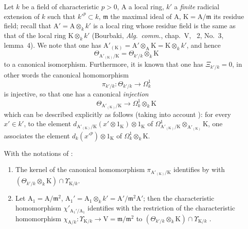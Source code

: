 \begin{env}[22.5.5]
\label{0.22.5.5}
Let $k$ be a field of characteristic $p>0$, $\mathrm{A}$ a local ring, $k'$ a \emph{finite} radicial extension of $k$ such that $k'^p\subset k$, $\mathfrak{m}$ the maximal ideal of $\mathrm{A}$, $\mathrm{K}=\mathrm{A}/\mathfrak{m}$ its residue field; recall that $\mathrm{A}'=\mathrm{A}\otimes_kk'$ is a local ring whose residue field is the same as that of the local ring $\mathrm{K}\otimes_kk'$ (Bourbaki, \emph{Alg.~comm.}, chap.~V, \textsection~2, No.~3, lemma~4).
We note that one has $\mathrm{A}'_{(\mathrm{K})}=\mathrm{A}'\otimes_\mathrm{A}\mathrm{K}=\mathrm{K}\otimes_kk'$, and hence 
\[
\label{0.22.5.5.1}
  \Theta_{\mathrm{A}'_{(\mathrm{K})}/\mathrm{K}}=\Theta_{k'/k}\otimes_k\mathrm{K}
  \tag{22.5.5.1}
\]
to a canonical isomorphism.
Furthermore, it is known  that one has $\Xi_{k'/k}=0$, in other words the canonical homomorphism 
\[
  \pi_{k'/k}:\Theta_{k'/k}\to\Omega^1_k
\]
is injective, so that one has a canonical \emph{injection}
\[
\label{0.22.5.5.2}
  \Theta_{\mathrm{A}'_{(\mathrm{K})}/\mathrm{K}}\to\Omega^1_k\otimes_k\mathrm{K}
  \tag{22.5.5.2}
\]
which can be described explicitly as follows (taking into account ): for every $x'\in k'$, to the element $d_{\mathrm{A}'_{(\mathrm{K})}/\mathrm{K}}(x'\otimes 1_\mathrm{K})\otimes 1_\mathrm{K}$ of $\Omega^1_{\mathrm{A}'_{(\mathrm{K})}/\mathrm{K}}\otimes_{\mathrm{A}'_{(\mathrm{K})}}\mathrm{K}$, one associates the element $d_k(x'^p)\otimes 1_\mathrm{K}$ of $\Omega^1_k\otimes_k\mathrm{K}$.
\end{env}

\begin{lemma}[22.5.6]
\label{0.22.5.6}
With the notations of :
\begin{enumerate}
  \item[\rm{(i)}] The kernel of the canonical homomorphism $\pi_{\mathrm{A}'_{(\mathrm{K})}/\mathrm{K}}$  identifies by  with $(\Theta_{k'/k}\otimes_k\mathrm{K})\cap\Upsilon_{\mathrm{K}/k}$.
  \item[\rm{(ii)}] Let $\mathrm{A}_1=\mathrm{A}/\mathfrak{m}^2$, $\mathrm{A}_1'=\mathrm{A}_1\otimes_kk'=\mathrm{A}'/\mathfrak{m}^2\mathrm{A}'$; then the characteristic homomorphism $\chi'_{\mathrm{A}_1'/\mathrm{A}_1}$  identifies with the restriction of the characteristic homomorphism $\chi_{\mathrm{A}/k}:\Upsilon_{\mathrm{K}/k}\to\mathrm{V}=\mathfrak{m}/\mathfrak{m}^2$ to $(\Theta_{k'/k}\otimes_k\mathrm{K})\cap\Upsilon_{\mathrm{K}/k}$ .
\end{enumerate}
\end{lemma}

